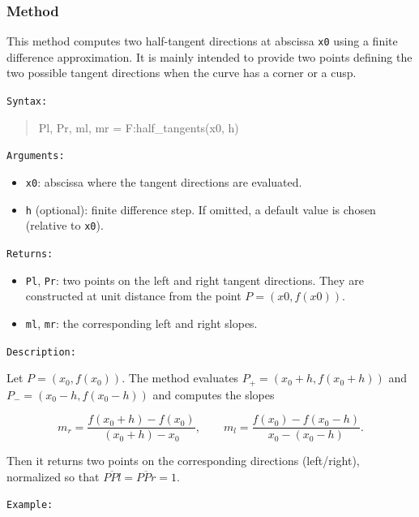 
\subsubsection{Method }
\label{ssub:method_fct_half_tangents}

This method computes two half-tangent directions at abscissa \texttt{x0}
using a finite difference approximation.
It is mainly intended to provide two points defining the two possible tangent
directions when the curve has a corner or a cusp.

\texttt{Syntax: }
\begin{quote}
Pl, Pr, ml, mr = F:half\_tangents(x0, h)
\end{quote}

\texttt{Arguments: }
\begin{itemize}
\item \texttt{x0}: abscissa where the tangent directions are evaluated.
\item \texttt{h} (optional): finite difference step. If omitted, a default value
is chosen (relative to \texttt{x0}).
\end{itemize}

\texttt{Returns: }
\begin{itemize}
\item \texttt{Pl}, \texttt{Pr}: two points on the left and right tangent directions.
They are constructed at unit distance from the point $P=(x0,f(x0))$.
\item \texttt{ml}, \texttt{mr}: the corresponding left and right slopes.
\end{itemize}

\texttt{Description: }

Let $P=(x_0,f(x_0))$. The method evaluates
$P_+=(x_0+h,f(x_0+h))$ and $P_-=(x_0-h,f(x_0-h))$ and computes the slopes

\[
m_r=\frac{f(x_0+h)-f(x_0)}{(x_0+h)-x_0}, \qquad
m_l=\frac{f(x_0)-f(x_0-h)}{x_0-(x_0-h)}.
\]

Then it returns two points on the corresponding directions (left/right),
normalized so that $\overline{PPl}=\overline{PPr}=1$.

\texttt{Example: }

